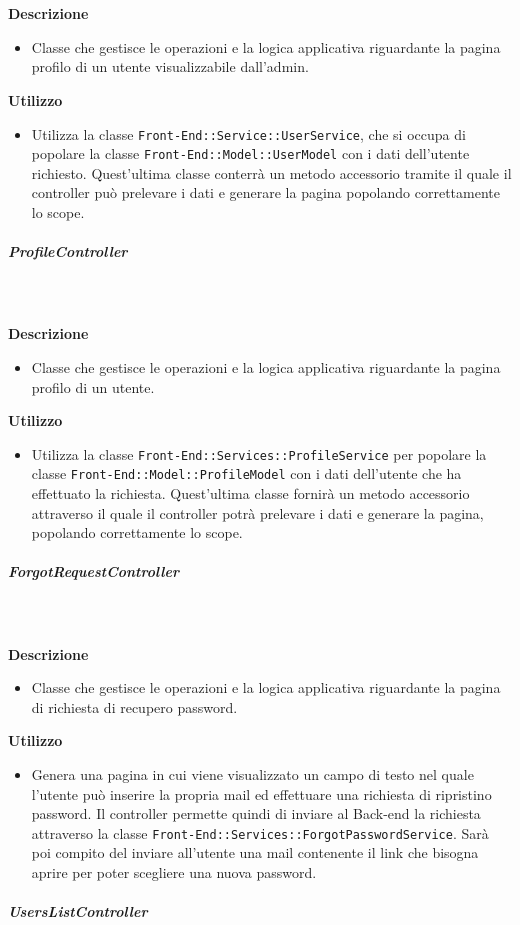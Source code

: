         \textbf{\\ \\ Descrizione} 
          \begin{itemize}
            \item[] Classe che gestisce le operazioni e la logica applicativa riguardante la pagina profilo di un utente visualizzabile dall'admin.
          \end{itemize}      
        \textbf{Utilizzo}  
          \begin{itemize}
            \item[] Utilizza la classe \texttt{Front-End::Service::UserService}, che si occupa di popolare la classe \texttt{Front-End::Model::UserModel} con i dati dell'utente richiesto. Quest'ultima classe conterrà un metodo accessorio tramite il quale il controller può prelevare i dati e generare la pagina popolando correttamente lo scope.
          \end{itemize}
      \subparagraph{ProfileController}
        
        \textbf{\\ \\ Descrizione} 
          \begin{itemize}
            \item[] Classe che gestisce le operazioni e la logica applicativa riguardante la pagina profilo di un utente.
          \end{itemize}      
        \textbf{Utilizzo}  
          \begin{itemize}
            \item[] Utilizza la classe \texttt{Front-End::Services::ProfileService} per popolare la classe \texttt{Front-End::Model::ProfileModel} con i dati dell'utente che ha effettuato la richiesta. Quest'ultima classe fornirà un metodo accessorio attraverso il quale il controller potrà prelevare i dati e generare la pagina, popolando correttamente lo scope.
          \end{itemize}
      \subparagraph{ForgotRequestController}
        
        \textbf{\\ \\ Descrizione} 
          \begin{itemize}
            \item[] Classe che gestisce le operazioni e la logica applicativa riguardante la pagina di richiesta di recupero password.
          \end{itemize}      
        \textbf{Utilizzo}  
          \begin{itemize}
            \item[] Genera una pagina in cui viene visualizzato un campo di testo nel quale l'utente può inserire la propria mail ed effettuare una richiesta di ripristino password. Il controller permette quindi di inviare al Back-end la richiesta attraverso la classe \texttt{Front-End::Services::ForgotPasswordService}. Sarà poi compito del  inviare all'utente una mail contenente il link che bisogna aprire per poter scegliere una nuova password.
          \end{itemize}
      \subparagraph{UsersListController}
        

